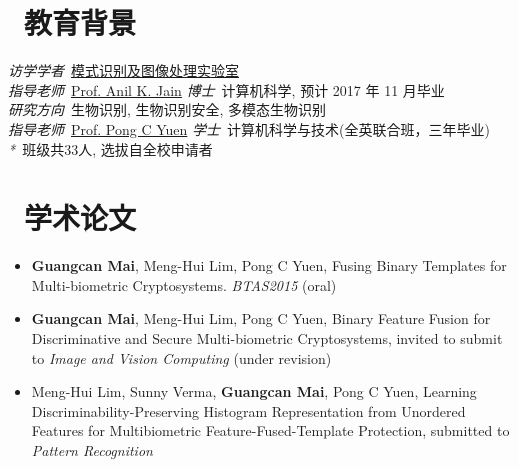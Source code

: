\documentclass{resume}
\begin{document}


 
\section{\faGraduationCap\  教育背景}
\textit{访学学者}\ \href{http://biometrics.cse.msu.edu}{模式识别及图像处理实验室}\\
\textit{指导老师}\ \href{http://cse.msu.edu/~jain}{Prof. Anil K. Jain}
\textit{博士}\ 计算机科学, 预计 2017 年 11 月毕业\\
\textit{研究方向}\ 生物识别, 生物识别安全, 多模态生物识别\\
\textit{指导老师}\ \href{http://www.comp.hkbu.edu.hk/~pcyuen}{Prof. Pong C Yuen}
\textit{学士}\ 计算机科学与技术(全英联合班，三年毕业)\\
\textit{*}\ 班级共33人, 选拔自全校申请者\\

\section{\faBook\ 学术论文}
\begin{itemize}
	\item \textbf{Guangcan Mai}, Meng-Hui Lim, Pong C Yuen, Fusing Binary Templates for Multi-biometric Cryptosystems. \textit{BTAS2015} (oral)
	\item \textbf{Guangcan Mai}, Meng-Hui Lim, Pong C Yuen, Binary Feature Fusion for Discriminative and Secure Multi-biometric Cryptosystems, invited to submit to \textit{Image and Vision Computing} (under revision)
	\item Meng-Hui Lim, Sunny Verma, \textbf{Guangcan Mai}, Pong C Yuen, Learning Discriminability-Preserving Histogram Representation from Unordered Features for Multibiometric Feature-Fused-Template Protection, submitted to \textit{Pattern Recognition}
\end{itemize}
\end{document}
